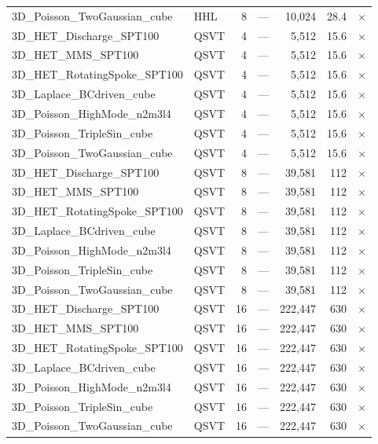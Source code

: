 \begin{table}[htbp]
\begin{tabular}{llrrrrl}
    3D\_Poisson\_TwoGaussian\_cube & HHL & 8 & --- & 10,024 & 28.4 & $\times$ \\
    3D\_HET\_Discharge\_SPT100 & QSVT & 4 & --- & 5,512 & 15.6 & $\times$ \\
    3D\_HET\_MMS\_SPT100 & QSVT & 4 & --- & 5,512 & 15.6 & $\times$ \\
    3D\_HET\_RotatingSpoke\_SPT100 & QSVT & 4 & --- & 5,512 & 15.6 & $\times$ \\
    3D\_Laplace\_BCdriven\_cube & QSVT & 4 & --- & 5,512 & 15.6 & $\times$ \\
    3D\_Poisson\_HighMode\_n2m3l4 & QSVT & 4 & --- & 5,512 & 15.6 & $\times$ \\
    3D\_Poisson\_TripleSin\_cube & QSVT & 4 & --- & 5,512 & 15.6 & $\times$ \\
    3D\_Poisson\_TwoGaussian\_cube & QSVT & 4 & --- & 5,512 & 15.6 & $\times$ \\
    3D\_HET\_Discharge\_SPT100 & QSVT & 8 & --- & 39,581 & 112 & $\times$ \\
    3D\_HET\_MMS\_SPT100 & QSVT & 8 & --- & 39,581 & 112 & $\times$ \\
    3D\_HET\_RotatingSpoke\_SPT100 & QSVT & 8 & --- & 39,581 & 112 & $\times$ \\
    3D\_Laplace\_BCdriven\_cube & QSVT & 8 & --- & 39,581 & 112 & $\times$ \\
    3D\_Poisson\_HighMode\_n2m3l4 & QSVT & 8 & --- & 39,581 & 112 & $\times$ \\
    3D\_Poisson\_TripleSin\_cube & QSVT & 8 & --- & 39,581 & 112 & $\times$ \\
    3D\_Poisson\_TwoGaussian\_cube & QSVT & 8 & --- & 39,581 & 112 & $\times$ \\
    3D\_HET\_Discharge\_SPT100 & QSVT & 16 & --- & 222,447 & 630 & $\times$ \\
    3D\_HET\_MMS\_SPT100 & QSVT & 16 & --- & 222,447 & 630 & $\times$ \\
    3D\_HET\_RotatingSpoke\_SPT100 & QSVT & 16 & --- & 222,447 & 630 & $\times$ \\
    3D\_Laplace\_BCdriven\_cube & QSVT & 16 & --- & 222,447 & 630 & $\times$ \\
    3D\_Poisson\_HighMode\_n2m3l4 & QSVT & 16 & --- & 222,447 & 630 & $\times$ \\
    3D\_Poisson\_TripleSin\_cube & QSVT & 16 & --- & 222,447 & 630 & $\times$ \\
    3D\_Poisson\_TwoGaussian\_cube & QSVT & 16 & --- & 222,447 & 630 & $\times$ \\

\end{tabular}
\end{table}
